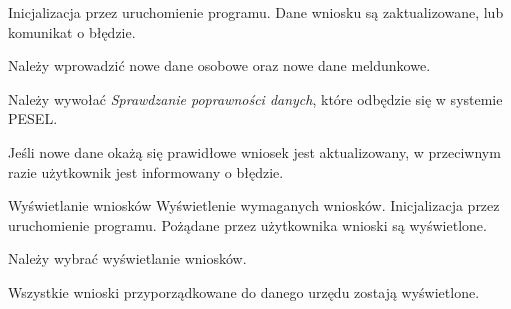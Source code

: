 \documentclass[12pt]{article}
\begin{document}
    {Inicjalizacja przez uruchomienie programu.}
    {Dane wniosku są zaktualizowane, lub komunikat o błędzie.}
    {
        \item Należy wprowadzić nowe dane osobowe oraz nowe dane meldunkowe.
        \item Należy wywołać \textit{Sprawdzanie poprawności danych}, które odbędzie się w systemie PESEL.
        \item Jeśli nowe dane okażą się prawidłowe wniosek jest aktualizowany, w przeciwnym razie użytkownik jest informowany o błędzie.
    }
\scenario
    {Wyświetlanie wniosków}
    {Wyświetlenie wymaganych wniosków.}
    {Inicjalizacja przez uruchomienie programu.}
    {Pożądane przez użytkownika wnioski są wyświetlone.}
    {
        \item Należy wybrać wyświetlanie wniosków.
        \item Wszystkie wnioski przyporządkowane do danego urzędu zostają wyświetlone.
    }
\end{document}

